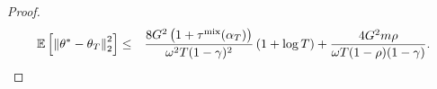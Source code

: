 \documentclass{colt2018} %
\DeclareMathOperator*{\mix}{mix}
\begin{document}
\begin{proof}
\begin{eqnarray*}
\mathbb{E}\left[\norm{\theta^* - \theta_T}_2^2 \right] &\leq& \frac{8 G^2 \left(1 + \tau^{\mix}(\alpha_T)\right)}{\omega^2 T(1-\gamma)^2} \left(1+\log T\right) + \frac{4G^2 m \rho}{\omega T(1-\rho)(1-\gamma)}.
\end{eqnarray*}

\end{proof}
\end{document}
